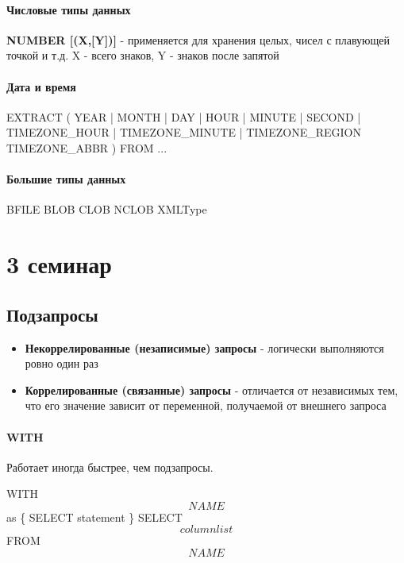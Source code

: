 \documentclass[a5paper,10pt]{article}
\begin{document}
\begin{lstlistening}
\begin{lstlistening}
\begin{lstlistening}
\begin{lstlistening}
			\paragraph{Числовые типы данных}
				\textbf{NUMBER [(X,[Y])]} - применяется для хранения целых, чисел с плавующей точкой и т.д.
				X - всего знаков, Y - знаков после запятой

			\paragraph{Дата и время}
				\begin{lstlistening}
					EXTRACT (
						{ YEAR | MONTH | DAY | HOUR | MINUTE | SECOND }
						| { TIMEZONE\_HOUR | TIMEZONE\_MINUTE }
						| { TIMEZONE\_REGION TIMEZONE_ABBR }
					)
					FROM ...
				\end{lstlistening}

			\paragraph{Большие типы данных}
				BFILE
				BLOB
				CLOB
				NCLOB
				XMLType

	\section{3 семинар}	
		\subsection{Подзапросы}
			\begin{itemize}
				\item \textbf{Некоррелированные (незаписимые) запросы} - логически выполняются ровно один раз
				\item \textbf{Коррелированные (связанные) запросы} - отличается от независимых тем, что его значение зависит от переменной, получаемой от внешнего запроса
			\end{itemize}

			\paragraph{WITH}
				\begin{framed}
					Работает иногда быстрее, чем подзапросы.
				\end{framed}
				\begin{lstlistening}
					WITH \[NAME\] as
					\{
						SELECT statement
					\}
					SELECT \[column list\]
					FROM \[NAME\]
				\end{lstlistening}
			

\end{lstlistening}
\end{lstlistening}
\end{lstlistening}
\end{lstlistening}
\end{document}
